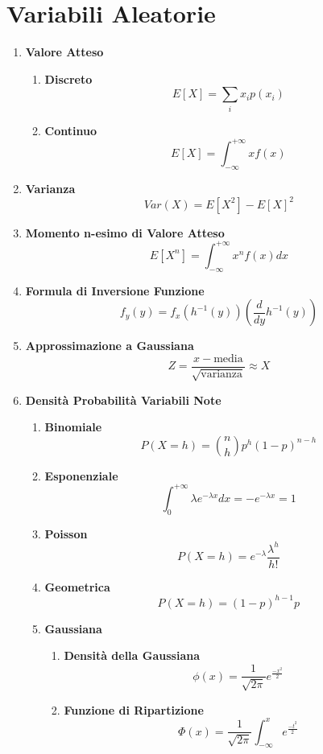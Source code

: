 \documentclass{article}
\begin{document}
\section{Variabili Aleatorie}

\begin{enumerate}
    \item \textbf{Valore Atteso}
    \begin{enumerate}
        \item \textbf{Discreto}
        \[ \boxed{E[X] = \sum_{i} x_{i}p(x_{i})} \]
        \item \textbf{Continuo}
        \[ \boxed{E[X] = \int_{-\infty}^{+\infty} x f(x)} \]
    \end{enumerate}
    \item \textbf{Varianza}
    \[ \boxed{Var(X) =  E[X^{2}] - E[X]^{2} }\]
    \item \textbf{Momento n-esimo di Valore Atteso}
    \[ \boxed{E[X^{n}] = \int_{-\infty}^{+\infty} x^{n}f(x) dx} \]
    \item \textbf{Formula di Inversione Funzione}
    \[ \boxed{f_{y}(y) = f_{x}(h^{-1}(y))(\frac{d}{dy} h^{-1}(y))} \]

\newpage
    \item \textbf{Approssimazione a Gaussiana}
    \[ \boxed{Z = \frac{x-\text{media}}{\sqrt{\text{varianza}}} \approx X} \]
    \item \textbf{Densità Probabilità Variabili Note}
    \begin{enumerate}
        \item \textbf{Binomiale}
        \[ \boxed{P(X=h) = \binom{n}{h} p^h (1-p)^{n-h}} \]
        \item \textbf{Esponenziale}
        \[ \boxed{\int_{0}^{+\infty} \lambda e^{-\lambda x}dx = - e^{-\lambda x} = 1} \]
        \item \textbf{Poisson}
        \[ \boxed{P(X=h) = e^{-\lambda}\frac{\lambda^h}{h!}} \]
        \item \textbf{Geometrica}
        \[ \boxed{P(X=h) = (1-p)^{h-1}p} \]
        \item \textbf{Gaussiana}
        \begin{enumerate}
            \item \textbf{Densità della Gaussiana}
            \[ \boxed{\phi(x) = \frac{1}{\sqrt{2\pi}} e^{\frac{-x^2}{2}} } \]
            \item \textbf{Funzione di Ripartizione}
            \[ \boxed{\Phi(x) = \frac{1}{\sqrt{2\pi}} \int_{-\infty}^{x} e^{\frac{-t^2}{2}}} \]
        \end{enumerate}

    \end{enumerate}

\end{enumerate}
\end{document}
